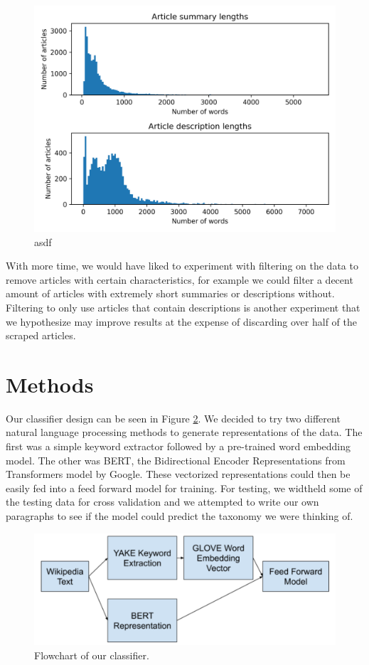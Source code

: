 \documentclass[10pt,twocolumn,letterpaper]{article}
\begin{document}
\begin{figure}
  \includegraphics[width=\linewidth]{article_lengths.png}
  \caption{asdf}
  \label{fig:article_lengths}
\end{figure}

With more time, we would have liked to experiment with filtering on the data to remove articles with certain characteristics, for example we could filter a decent amount of articles with extremely short summaries or descriptions without. Filtering to only use articles that contain descriptions is another experiment that we hypothesize may improve results at the expense of discarding over half of the scraped articles. 

\section{Methods}
\label{section:methods}

Our classifier design can be seen in Figure \ref{fig:classifier_overview}. We decided to try two different natural language processing methods to generate representations of the data. The first was a simple keyword extractor followed by a pre-trained word embedding model. The other was BERT, the Bidirectional Encoder Representations from Transformers model by Google. These vectorized representations could then be easily fed into a feed forward model for training. For testing, we widtheld some of the testing data for cross validation and we attempted to write our own paragraphs to see if the model could predict the taxonomy we were thinking of. 
\begin{figure}
  \includegraphics[width=\linewidth]{classifier_overview.png}
  \caption{Flowchart of our classifier.}
  \label{fig:classifier_overview}
\end{figure}
\end{document}

